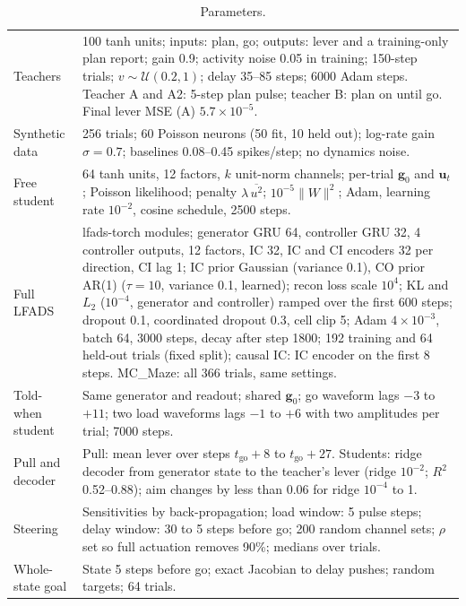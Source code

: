 \documentclass[11pt,a4paper]{article}
\newcommand{\vect}[1]{\bm{#1}}
\begin{document}
\begin{table}[h]
  \centering
  \caption{Parameters.}
  \label{tab:params}
  \small
  \begin{tabularx}{\linewidth}{@{}p{3.8cm}X@{}}
    \toprule
    Teachers & 100 tanh units; inputs: plan, go; outputs: lever and a training-only plan report; gain 0.9; activity noise 0.05 in training; 150-step trials; $v\sim\mathcal U(0.2,1)$; delay 35--85 steps; 6000 Adam steps. Teacher A and A2: 5-step plan pulse; teacher B: plan on until go. Final lever MSE (A) $5.7\times10^{-5}$. \\
    Synthetic data & 256 trials; 60 Poisson neurons (50 fit, 10 held out); log-rate gain $\sigma=0.7$; baselines 0.08--0.45 spikes/step; no dynamics noise. \\
    Free student & 64 tanh units, 12 factors, $k$ unit-norm channels; per-trial $\vect g_0$ and $\vect u_t$; Poisson likelihood; penalty $\lambda\,\overline{u^2}$; $10^{-5}\lVert W\rVert^2$; Adam, learning rate $10^{-2}$, cosine schedule, 2500 steps. \\
    Full LFADS & lfads-torch modules; generator GRU 64, controller GRU 32, 4 controller outputs, 12 factors, IC 32, IC and CI encoders 32 per direction, CI lag 1; IC prior Gaussian (variance 0.1), CO prior AR(1) ($\tau=10$, variance 0.1, learned); recon loss scale $10^4$; KL and $L_2$ ($10^{-4}$, generator and controller) ramped over the first 600 steps; dropout 0.1, coordinated dropout 0.3, cell clip 5; Adam $4\times10^{-3}$, batch 64, 3000 steps, decay after step 1800; 192 training and 64 held-out trials (fixed split); causal IC: IC encoder on the first 8 steps. MC\_Maze: all 366 trials, same settings. \\
    Told-when student & Same generator and readout; shared $\vect g_0$; go waveform lags $-3$ to $+11$; two load waveforms lags $-1$ to $+6$ with two amplitudes per trial; 7000 steps. \\
    Pull and decoder & Pull: mean lever over steps $t_{\mathrm{go}}+8$ to $t_{\mathrm{go}}+27$. Students: ridge decoder from generator state to the teacher's lever (ridge $10^{-2}$; $R^2$ 0.52--0.88); aim changes by less than 0.06 for ridge $10^{-4}$ to 1. \\
    Steering & Sensitivities by back-propagation; load window: 5 pulse steps; delay window: 30 to 5 steps before go; 200 random channel sets; $\rho$ set so full actuation removes 90\%; medians over trials. \\
    Whole-state goal & State 5 steps before go; exact Jacobian to delay pushes; random targets; 64 trials. \\

\end{tabularx}
\end{table}
\end{document}
